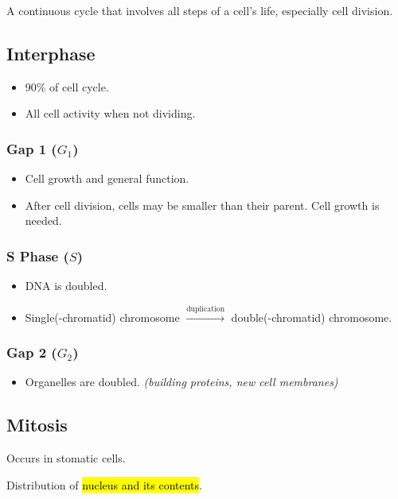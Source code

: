 \documentclass[a4paper,12pt]{article}
\begin{document}
A continuous cycle that involves all steps of a cell's life, especially cell division.

\subsection{Interphase}

\begin{itemize}
    \item{90\% of cell cycle.}
    \item{All cell activity when not dividing.}
\end{itemize}

\subsubsection{Gap 1 ($G_1$)}
\begin{itemize}
    \item{Cell growth and general function.}
    \item{After cell division, cells may be smaller than their parent. Cell growth is needed.}
\end{itemize}

\subsubsection{S Phase ($S$)}
\begin{itemize}
    \item{DNA is doubled.}
    \item{Single(-chromatid) chromosome $\xrightarrow{\textrm{duplication}}$ double(-chromatid) chromosome.}
\end{itemize}

\subsubsection{Gap 2 ($G_2$)}
\begin{itemize}
    \item{Organelles are doubled. \emph{(building proteins, new cell membranes)}}
\end{itemize}

\subsection{Mitosis}\noindent

Occurs in stomatic cells.

Distribution of \hl{nucleus and its contents}.
\end{document}
